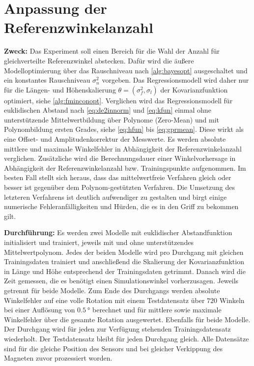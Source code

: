 %

\section{Anpassung der Referenzwinkelanzahl}\label{sec:exp2}


\textbf{Zweck:} Das Experiment soll einen Bereich für die Wahl der Anzahl für gleichverteilte Referenzwinkel abstecken. Dafür wird die äußere Modelloptimierung über das Rauschniveau nach \autoref{alg:bayesopt} ausgeschaltet und ein konstantes Rauschniveau $\sigma_n^2$ vorgeben. Das Regressionsmodell wird daher nur für die Längen- und Höhenskalierung $\theta = (\sigma_f^2, \sigma_l)$ der Kovarianzfunktion optimiert, siehe \autoref{alg:fminconopt}. Verglichen wird das Regressionsmodell für euklidischen Abstand nach \autoref{eq:de2innorm} und \autoref{eq:kfun} einmal ohne unterstützende Mittelwertbildung über Polynome (Zero-Mean) und mit Polynombildung ersten Grades, siehe \autoref{eq:hfun} bis \autoref{eq:gprmean}. Diese wirkt als eine Offset- und Amplitudenkorrektur der Messwerte. Es werden absolute mittlere und maximale Winkelfehler in Abhängigkeit der Referenzwinkelanzahl verglichen. Zusätzliche wird die Berechnungsdauer einer Winkelvorhersage in Abhängigkeit der Referenzwinkelanzahl bzw. Trainingspunkte aufgenommen. Im besten Fall stellt sich heraus, dass das mittelwertfreie Verfahren gleich oder besser ist gegenüber dem Polynom-gestützten Verfahren. Die Umsetzung des letzteren Verfahrens ist deutlich aufwendiger zu gestalten und birgt einige numerische Fehleranfälligkeiten und Hürden, die es in den Griff zu bekommen gilt.

\textbf{Durchführung:} Es werden zwei Modelle mit euklidischer Abstandfunktion initialisiert und trainiert, jeweils mit und ohne unterstützendes Mittelwertpolynom. Jedes der beiden Modelle wird pro Durchgang mit gleichen Trainingsdaten trainiert und anschließend die Skalierung der Kovarianzfunktion in Länge und Höhe entsprechend der Trainingsdaten getrimmt. Danach wird die Zeit gemessen, die es benötigt einen Simulationswinkel vorherzusagen. Jeweils getrennt für beide Modelle. Zum Ende des Durchgangs werden absolute Winkelfehler auf eine volle Rotation mit einem Testdatensatz über $720$ Winkeln bei einer Auflösung von $\SI{0,5}{\degree}$ berechnet und für mittlere sowie maximale Winkelfehler über die gesamte Rotation ausgewertet. Ebenfalls für beide Modelle. Der Durchgang wird für jeden zur Verfügung stehenden Trainingsdatensatz wiederholt. Der Testdatensatz bleibt für jeden Durchgang gleich. Alle Datensätze sind für die gleiche Position des Sensors und bei gleicher Verkippung des Magneten zuvor prozessiert worden.

